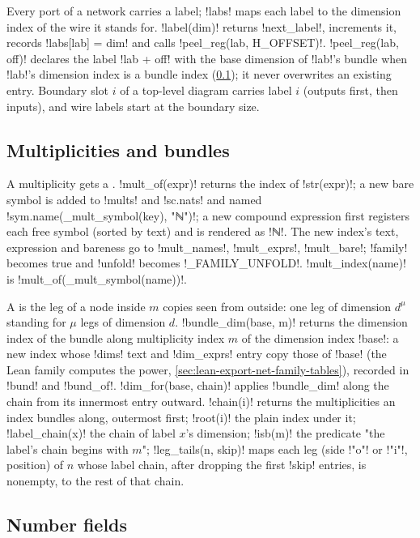 {Every port of a network carries a label; \py!labs! maps each label to the dimension index of the
wire it stands for. \py!label(dim)! returns \py!next_label!, increments it, records
\py!labs[lab] = dim! and calls \py!peel_reg(lab, H_OFFSET)!. \py!peel_reg(lab, off)! declares
the label \py!lab + off! with the base dimension of \py!lab!'s bundle when \py!lab!'s dimension
index is a bundle index (\cref{sec:lean-export-net-bundles}); it never overwrites an existing
entry. Boundary slot $i$ of a top-level diagram carries label $i$ (outputs first, then inputs),
and wire labels start at the boundary size.

\subsection{Multiplicities and bundles}\label{sec:lean-export-net-bundles}

A \bbox{} multiplicity gets a . \py!mult_of(expr)! returns the index of
\py!str(expr)!; a new bare symbol is added to \py!mults! and \py!sc.nats! and named
\py!sym.name(_mult_symbol(key), "ℕ")!; a new compound expression first registers each free
symbol (sorted by text) and is rendered as \code!ℕ!. The new index's text, expression and
bareness go to \py!mult_names!, \py!mult_exprs!, \py!mult_bare!; \py!family! becomes true and
\py!unfold! becomes \py!_FAMILY_UNFOLD!. \py!mult_index(name)! is \py!mult_of(_mult_symbol(name))!.

A  is the leg of a node inside $m$ copies seen from outside: one leg of dimension
$d^{\mu}$ standing for $\mu$ legs of dimension $d$. \py!bundle_dim(base, m)! returns the
dimension index of the bundle along multiplicity index $m$ of the dimension index \py!base!:
a new index whose \py!dims! text and \py!dim_exprs! entry copy those of \py!base! (the Lean
family computes the power, \cref{sec:lean-export-net-family-tables}), recorded in \py!bund! and
\py!bund_of!. \py!dim_for(base, chain)! applies \py!bundle_dim! along the chain from its
innermost entry outward. \py!chain(i)! returns the multiplicities an index bundles along,
outermost first; \py!root(i)! the plain index under it; \py!label_chain(x)! the chain of label
$x$'s dimension; \py!isb(m)! the predicate "the label's chain begins with $m$";
\py!leg_tails(n, skip)! maps each leg (side \code!"o"! or \code!"i"!, position) of $n$ whose label
chain, after dropping the first \py!skip! entries, is nonempty, to the rest of that chain.

\subsection{Number fields}\label{sec:lean-export-net-field}

}
